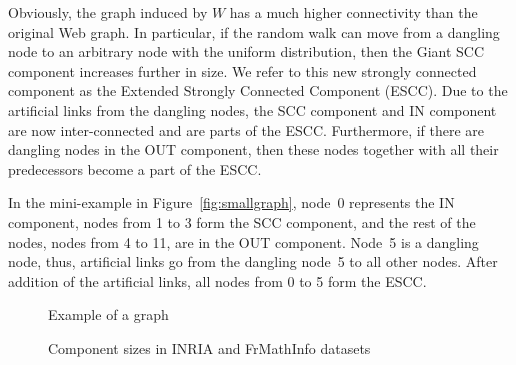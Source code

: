 \documentclass{article}
\begin{document}
Obviously, the graph induced by $W$ has a much higher connectivity
than the original Web graph. In particular, if the random walk can
move from a dangling node to an arbitrary node with the uniform
distribution, then the Giant SCC component increases further in
size. We refer to this new strongly connected component as the
Extended Strongly Connected Component (ESCC). Due to the artificial
links from the dangling nodes, the SCC component and IN component
are now inter-connected and are parts of the ESCC. Furthermore, if
there are dangling nodes in the OUT component, then these nodes
together with all their predecessors become a part of the ESCC.

In the mini-example in Figure~\ref{fig:smallgraph},
node~0 represents the IN component, nodes from 1 to 3 form the SCC
component, and the rest of the nodes, nodes from 4 to 11, are in
the OUT component. Node~5 is a dangling node, thus, artificial
links go from the dangling node~5 to all other nodes. After
addition of the artificial links, all nodes from 0 to 5 form the ESCC.



\begin{figure}[h]
  \begin{minipage}{0.4\textwidth}
    \begin{center}
        \caption{Example of a graph}
        \label{fig:smallgraph}
    \end{center}
  \end{minipage}
\nolinebreak
  \begin{minipage}{0.4\textwidth}
    \begin{center}
 \caption{Component sizes in INRIA and FrMathInfo
datasets} \label{tab:sizes}
    \end{center}
  \end{minipage}
\end{figure}
\end{document}
